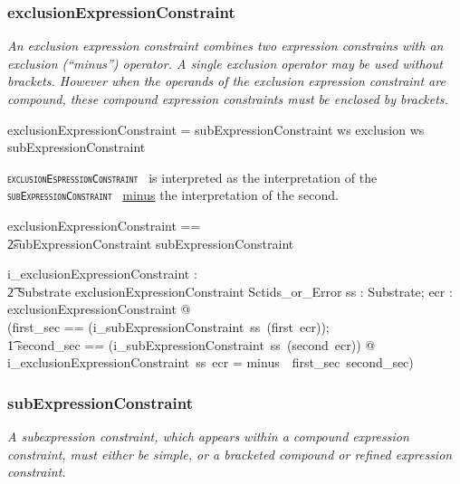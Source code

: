 \documentclass{article}
\def\spec#1{{\tt \small \textsc{{#1}} }}
\def\bnf#1{{\scriptsize {{#1}} }}
\def\desc#1{{\small \textsl{{#1}} }}
\begin{document}
\subsubsection{exclusionExpressionConstraint}
\begin{framed}
\desc{An exclusion expression constraint combines two expression constrains with an exclusion (``minus'') operator. A single exclusion operator may be used without brackets. However when the operands of the exclusion expression constraint are compound, these compound expression constraints must be enclosed by brackets.}
\end{framed}

\begin{framed}
\noindent
\bnf{exclusionExpressionConstraint = subExpressionConstraint ws exclusion ws subExpressionConstraint}
\end{framed}

\spec{exclusionEspressionConstraint} is interpreted as the  interpretation of the
\spec{subExpressionConstraint} \underline{minus} the interpretation of the second.

\begin{zed}
exclusionExpressionConstraint == \\ 
\t2subExpressionConstraint \cross subExpressionConstraint
\end{zed}

\begin{axdef}
    i\_exclusionExpressionConstraint : \\
\t2 Substrate \fun exclusionExpressionConstraint \fun Sctids\_or\_Error
\where
   \forall ss : Substrate; ecr : exclusionExpressionConstraint @ \\
   (\LET first\_sec == (i\_subExpressionConstraint~ss~(first~ecr)); \\
   \t1 second\_sec == (i\_subExpressionConstraint~ss~(second~ecr)) @ \\
i\_exclusionExpressionConstraint~ss~ecr =  minus~~first\_sec~second\_sec)
\end{axdef}

\subsubsection{subExpressionConstraint}
\begin{framed}
\desc{A subexpression constraint, which appears within a compound expression constraint, must either be simple, or a bracketed compound or refined expression constraint.}
\end{framed}
\end{document}
